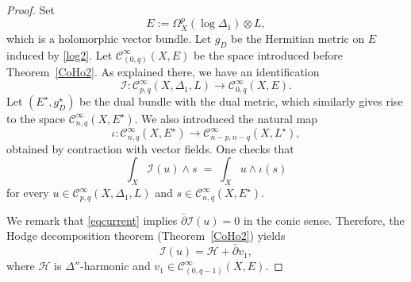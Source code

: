 \documentclass[english]{amsart}
\newcommand{\cC}{\mathcal{C}}
\newcommand{\cI}{\mathcal{I}}
\newcommand{\dbar}{\bar \partial}
\numberwithin{equation}{thm}
\begin{document}
			\begin{proof}
				Set
				\[
				E := \Omega_X^p(\log \Delta_1)\otimes L,
				\]
				which is a holomorphic vector bundle. Let $g_D$ be the Hermitian metric on $E$ induced by \eqref{log2}.
				Let $\mathcal{C}^\infty_{(0,q)}(X,E)$ be the space introduced before Theorem~\ref{CoHo2}.
				As explained there, we have an identification
				\[
				\cI:\cC^\infty_{p,q}(X,\Delta_1,L)\longrightarrow \cC^\infty_{0,q}(X,E).
				\]
				Let $(E^\star,g_D^\star)$ be the dual bundle with the dual metric, which similarly gives rise to the space $\cC^\infty_{n,q}(X,E^\star)$.
				We also introduced the natural map
				\[
				\iota:\cC^\infty_{n,q}(X,E^\star)\longrightarrow \cC^\infty_{n-p,n-q}(X,L^\star),
				\]
				obtained by contraction with vector fields. One checks that
				\begin{equation}\label{contracteq}
					\int_X \cI(u)\wedge s \;=\; \int_X u\wedge \iota(s)
				\end{equation}
				for every $u\in \cC^\infty_{p,q}(X,\Delta_1,L)$ and $s\in \cC^\infty_{n,q}(X,E^\star)$.
				
				\medskip
				
				We remark that \eqref{eqcurrent} implies $\dbar \cI(u)=0$ in the conic sense.
				Therefore, the Hodge decomposition theorem (Theorem~\ref{CoHo2}) yields
				\begin{equation}\label{reg4}
					\cI(u)=\mathcal H + \dbar v_1,
				\end{equation}
				where $\mathcal H$ is $\Delta''$-harmonic and $v_1\in \cC^\infty_{(0,q-1)}(X,E)$.
				
				\medskip
				

\end{proof}
\end{document}
